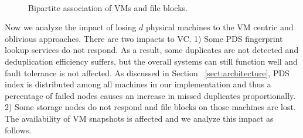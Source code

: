 \begin{figure}[htb]
    \centering
    \\
    \caption{Bipartite association of VMs and file blocks. }
    \label{fig:share}
\end{figure}




Now we  analyze  the impact of losing $d$ physical machines 
to the VM centric and oblivious approaches.  
There are two impacts to VC. 
1) Some PDS fingerprint lookup services do not respond.  As  a result, some duplicates
are not detected and deduplication efficiency suffers, but the overall systems can still
function well and fault tolerance is not affected.  As discussed in Section ~\ref{sect:architecture}, 
PDS index is distributed
among all machines in our implementation and thus a percentage of failed nodes
causes an increase in missed duplicates proportionally.
2) Some storage nodes do not  respond and file blocks on those machines are lost. The availability of
VM snapshots is affected and we analyze this impact as follows.



